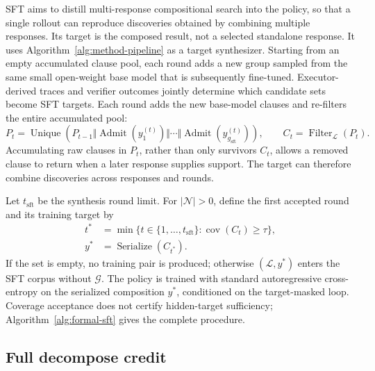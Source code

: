 SFT aims to distill multi-response compositional search into the policy, so
that a single rollout can reproduce discoveries obtained by combining
multiple responses.  Its target is the composed result, not a selected
standalone response.  It uses Algorithm~\ref{alg:method-pipeline} as a target
synthesizer.  Starting
from an empty accumulated clause pool, each round adds a new group sampled
from the same small open-weight base model that is subsequently fine-tuned.
Executor-derived traces and verifier outcomes jointly determine which
candidate sets become SFT targets.  Each round adds the new base-model clauses
and re-filters the entire accumulated pool:
\begin{equation}
  P_t=\operatorname{Unique}\!\left(P_{t-1}\Vert
    \operatorname{Admit}(y_1^{(t)})\Vert\cdots\Vert
    \operatorname{Admit}(y_{g_{\mathrm{sft}}}^{(t)})\right),
  \qquad
  C_t=\operatorname{Filter}_{\mathcal L}(P_t).
  \label{eq:method-sft}
\end{equation}
Accumulating raw clauses in \(P_t\), rather than only survivors \(C_t\),
allows a removed clause to return when a later response supplies support.
The target can therefore combine discoveries across responses and rounds.

Let \(t_{\mathrm{sft}}\) be the synthesis round limit.  For
\(|\mathcal N|>0\), define the first accepted round and its training target by
\begin{align}
 t^*&=\min\{t\in\{1,\ldots,t_{\mathrm{sft}}\}:
             \operatorname{cov}(C_t)\ge\tau\},\nonumber\\
 y^*&=\operatorname{Serialize}(C_{t^*}).
 \label{eq:main-sft-acceptance}
\end{align}
If the set is empty, no training pair is produced; otherwise
\((\mathcal L,y^*)\) enters the SFT corpus without \(\mathcal G\).
The policy is trained with standard autoregressive cross-entropy on the
serialized composition \(y^*\), conditioned on the target-masked loop.
Coverage acceptance does not certify hidden-target sufficiency;
Algorithm~\ref{alg:formal-sft} gives the complete procedure.

\subsection{Full decompose credit}
\label{sec:method:reward}


